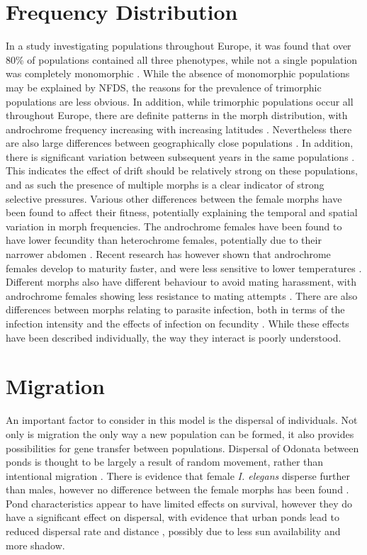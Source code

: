\documentclass{article}
\begin{document}
\section{Frequency Distribution}
In a study investigating populations throughout Europe, it was found that over 80\% of populations contained all three phenotypes, while not a single population was completely monomorphic \cite{Gosden2011}. While the absence of monomorphic populations may be explained by NFDS, the reasons for the prevalence of trimorphic populations are less obvious. In addition, while trimorphic populations occur all throughout Europe, there are definite patterns in the morph distribution, with androchrome frequency increasing with increasing latitudes \cite{Gosden2011}. Nevertheless there are also large differences between geographically close populations \cite{Gosden2011}. In addition, there is significant variation between subsequent years in the same populations \cite{Svensson2005}. This indicates the effect of drift should be relatively strong on these populations, and as such the presence of multiple morphs is a clear indicator of strong selective pressures.
Various other differences between the female morphs have been found to affect their fitness, potentially explaining the temporal and spatial variation in morph frequencies. The androchrome females have been found to have lower fecundity than heterochrome females, potentially due to their narrower abdomen \cite{Gosden2009}. Recent research has however shown that androchrome females develop to maturity faster, and were less sensitive to lower temperatures \cite{Svensson2019}.
Different morphs also have different behaviour to avoid mating harassment, with androchrome females showing less resistance to mating attempts \cite{Gosden2009}. There are also differences between morphs relating to parasite infection, both in terms of the infection intensity and the effects of infection on fecundity \cite{Willink2017}.
While these effects have been described individually, the way they interact is poorly understood.

\section{Migration}
An important factor to consider in this model is the dispersal of individuals. Not only is migration the only way a new population can be formed, it also provides possibilities for gene transfer between populations. Dispersal of Odonata between ponds is thought to be largely a result of random movement, rather than intentional migration \cite{conrad2002, Moore1954}.
There is evidence that female \textit{I. elegans} disperse further than males, however no difference between the female morphs has been found \cite{conrad2002}.
Pond characteristics appear to have limited effects on survival, however they do have a significant effect on dispersal, with evidence that urban ponds lead to reduced dispersal rate and distance \cite{Gall2017}, possibly due to less sun availability and more shadow.

\printbibliography
\end{document}
